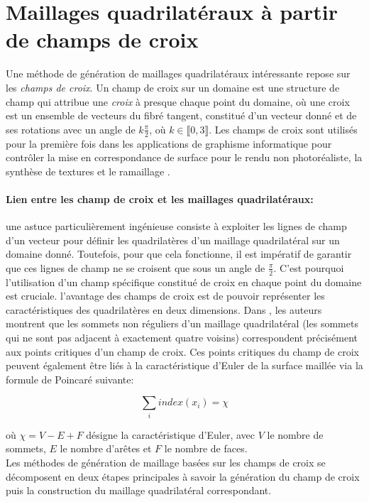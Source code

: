 \section{Maillages quadrilatéraux à partir de champs de croix}

Une méthode de génération de maillages quadrilatéraux intéressante repose sur les \emph{champs de croix}. Un champ de croix sur un domaine est une structure de champ qui attribue une \emph{croix} à presque chaque point du domaine, où une croix est un ensemble de vecteurs du fibré tangent, constitué d'un vecteur donné et de ses rotations avec un angle de $k\displaystyle\frac{\pi}{2}$, où $k \in \llbracket 0,3\rrbracket$. Les champs de croix sont utilisés pour la première fois dans les applications de graphisme informatique pour contrôler la mise en correspondance de surface pour le rendu non photoréaliste, la synthèse de textures et le ramaillage \cite{ray2008n, bommes2009mixed, nieser2011cubecover}.\\

\paragraph{Lien entre les champ de croix et les maillages quadrilatéraux:} une astuce particulièrement ingénieuse consiste à exploiter les lignes de champ d'un vecteur pour définir les quadrilatères d'un maillage quadrilatéral sur un domaine donné. Toutefois, pour que cela fonctionne, il est impératif de garantir que ces lignes de champ ne se croisent que sous un angle de $\frac{\pi}{2}$. C'est pourquoi l'utilisation d'un champ spécifique constitué de croix en chaque point du domaine est cruciale. l'avantage des champs de croix est de pouvoir représenter les caractéristiques des quadrilatères en deux dimensions. Dans \cite{beaufort2017computing}, les auteurs montrent que les sommets non réguliers d'un maillage quadrilatéral (les sommets qui ne sont pas adjacent à exactement quatre voisins) correspondent précisément aux points critiques d'un champ de croix. Ces points critiques du champ de croix peuvent également être liés à la caractéristique d'Euler de la surface maillée via la formule de Poincaré suivante:

$$
\sum_i index(x_i)=\chi
$$

où $\chi=V-E+F$ désigne la caractéristique d'Euler, avec $V$ le nombre de sommets, $E$ le nombre d'arêtes et $F$ le nombre de faces.\\

Les méthodes de génération de maillage basées sur les champs de croix se décomposent en deux étapes principales à savoir la génération du champ de croix puis la construction du maillage quadrilatéral correspondant.

